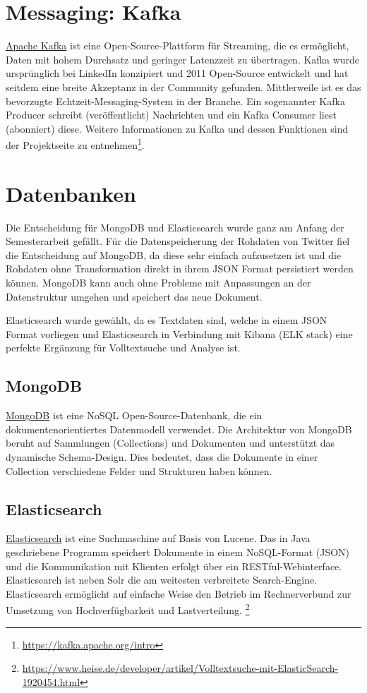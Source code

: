 \section{Messaging: Kafka}
\label{sec:messaging}

\href{http://kafka.apache.org}{Apache Kafka} ist eine Open-Source-Plattform f{\"u}r Streaming, die es erm{\"o}glicht, Daten mit hohem Durchsatz und geringer Latenzzeit zu {\"u}bertragen. Kafka wurde urspr{\"u}nglich bei LinkedIn konzipiert und 2011 Open-Source entwickelt und hat seitdem eine breite Akzeptanz in der Community gefunden. Mittlerweile ist es das bevorzugte Echtzeit-Messaging-System in der Branche. Ein sogenannter Kafka Producer schreibt (ver{\"o}ffentlicht) Nachrichten und ein Kafka Consumer liest (abonniert) diese. Weitere Informationen zu Kafka und dessen Funktionen sind der Projektseite zu entnehmen\footnote{\label{foot:3} \url{https://kafka.apache.org/intro}}.


\section{Datenbanken}
\label{sec:datenbanken}

Die Entscheidung f{\"u}r MongoDB und Elasticsearch wurde ganz am Anfang der Semesterarbeit gef{\"a}llt. F{\"u}r die Datenspeicherung der Rohdaten von Twitter fiel die Entscheidung auf MongoDB, da diese sehr einfach aufzusetzen ist und die Rohdaten ohne Transformation direkt in ihrem JSON Format persistiert werden k{\"o}nnen. MongoDB kann auch ohne Probleme mit Anpassungen an der Datenstruktur umgehen und speichert das neue Dokument.

Elasticsearch wurde gew{\"a}hlt, da es Textdaten sind, welche in einem JSON Format vorliegen und Elasticsearch in Verbindung mit Kibana (ELK stack) eine perfekte Erg{\"a}nzung f{\"u}r Volltextsuche und Analyse ist. 

\subsection{MongoDB}
\href{https://www.mongodb.com}{MongoDB} ist eine NoSQL Open-Source-Datenbank, die ein dokumentenorientiertes Datenmodell verwendet. Die Architektur von MongoDB beruht auf Sammlungen (Collections) und Dokumenten und  unterst{\"u}tzt das dynamische Schema-Design. Dies bedeutet, dass die Dokumente in einer Collection verschiedene Felder und Strukturen haben k{\"o}nnen.

\subsection{Elasticsearch}
\href{https://www.elastic.co/products/elastic-stack}{Elasticsearch} ist eine Suchmaschine auf Basis von Lucene. Das in Java geschriebene Programm speichert Dokumente in einem NoSQL-Format (JSON) und die Kommunikation mit Klienten erfolgt {\"u}ber ein RESTful-Webinterface. Elasticsearch ist neben Solr die am weitesten verbreitete Search-Engine. Elasticsearch erm{\"o}glicht auf einfache Weise den Betrieb im Rechnerverbund zur Umsetzung von Hochverf{\"u}gbarkeit und Lastverteilung. \footnote{\label{foot:4} \url{https://www.heise.de/developer/artikel/Volltextsuche-mit-ElasticSearch-1920454.html}}


